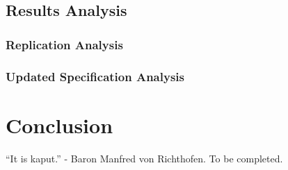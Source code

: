 \documentclass[10pt, journal]{IEEEtran}
\begin{document}
\subsection{Results Analysis}

\subsubsection{Replication Analysis}

\subsubsection{Updated Specification Analysis}

\section{Conclusion}
``It is kaput.'' - Baron Manfred von Richthofen. To be completed.



\end{document}
